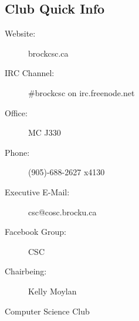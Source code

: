 \documentclass[10pt,letterpaper]{article}
\begin{document}
\begin{multicols}{3}

\section*{Club Quick Info}

\begin{description}

\item[Website:] brockcsc.ca %

\item[IRC Channel:] \#brockcsc on irc.freenode.net


\item[Office:] MC J330

\item[Phone:] (905)-688-2627 x4130

\item[Executive E-Mail:] csc@cosc.brocku.ca

\item[Facebook Group:] CSC

\item[Chairbeing:] Kelly Moylan

\end{description}




Computer Science Club


\end{multicols}
\end{document}
